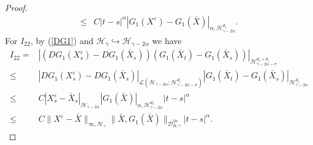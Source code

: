 \documentclass[10pt,a4paper]{amsart}
\begin{document}
\begin{proof}
\begin{align}
		\leq & C |t-s|^\alpha |G_1(X^\varepsilon)-G_1(\bar{X})|_{\alpha, \mathcal H_{\gamma-2\alpha}^{d_1}}.
	\end{align}
	For $I_{22}$, by (\ref{DG1}) and $\mathcal H_\gamma \hookrightarrow \mathcal H_{\gamma-2\alpha}$ we have	
	\begin{align}\label{I22}
		I_{22}=&\left|(DG_1(X_s^\varepsilon)-DG_1(\bar{X}_s)) (G_1(\bar{X}_t)-G_1(\bar{X}_s))  \right|_{\mathcal H_{\gamma-2\alpha-\sigma}^{d_1 \times d_1}} \nonumber\\
		\leq & \left|DG_1(X_s^\varepsilon)-DG_1(\bar{X}_s) \right|_{\mathcal L(\mathcal H_{\gamma-2\alpha};\mathcal H_{\gamma-2\alpha-\sigma}^{d_1 })} |G_1(\bar{X}_t)-G_1(\bar{X}_s)|_{\mathcal H_{\gamma-2\alpha}^{d_1 }} \nonumber\\
		\leq & C |X_s^\varepsilon-\bar{X}_s|_{\mathcal H_{\gamma-2\alpha}} |G_1(\bar{X})|_{\alpha, \mathcal H_{\gamma-2\alpha}^{d_1}} |t-s|^\alpha \nonumber\\
		\leq & C \|X^\varepsilon-\bar{X}\|_{\infty,\mathcal H_\gamma} \|\bar{X},G_1(\bar{X})\|_{\mathcal D_{B,\gamma}^{2\alpha}}  |t-s|^\alpha.
	\end{align}	
	
	
	

\end{proof}
\end{document}
